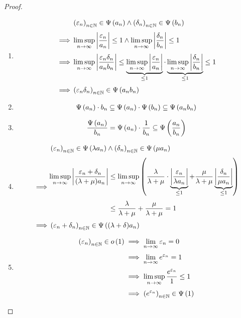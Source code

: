 \begin{proof}
\begin{enumerate}
    \item

      \begin{align}
        & \seq{\epsilon_n} \in \bigpsi{a_n} \land \seq{\delta_n} \in \bigpsi{b_n} \nl
        \implies & \limsup_{n\to\infty} \abs{\frac{\epsilon_n}{a_n}} \le 1 \land \limsup_{n\to\infty} \abs{\frac{\delta_n}{b_n}} \le 1 \nl
        \implies & \limsup_{n\to\infty} \abs{\frac{\epsilon_n\delta_n}{a_nb_n}} \le \underbrace{\limsup_{n\to\infty} \abs{\frac{\epsilon_n}{a_n}}}_{\le 1} \cdot \underbrace{\limsup_{n\to\infty} \abs{\frac{\delta_n}{b_n}}}_{\le 1} \le 1 \nl
        \implies & \seq{\epsilon_n\delta_n} \in \bigpsi{a_nb_n}
      \end{align}

    \item

      \begin{align}
        \Psi\left( {a_n} \right) \cdot b_n \subseteq \Psi\left( {a_n} \right) \cdot \Psi\left( {b_n} \right) \subseteq \Psi\left( {a_n b_n} \right)
      \end{align}

    \item

      \begin{align}
        \frac{\Psi\left( {a_n} \right)}{b_n} = \Psi\left( {a_n} \right) \cdot \frac{1}{b_n} \subseteq \Psi\left( {\frac{a_n}{b_n}} \right)
      \end{align}

    \item

      \begin{align}
        & \seq{\epsilon_n} \in \bigpsi{\lambda a_n} \land \seq{\delta_n} \in \bigpsi{\mu a_n} \nl
        \implies &
        \begin{aligned}
          \limsup_{n\to\infty} \abs{\frac{\epsilon_n+\delta_n}{(\lambda+\mu)a_n}} & \le \limsup_{n\to\infty} \left( \frac{\lambda}{\lambda + \mu} \cdot \underbrace{\abs{\frac{\epsilon_n}{\lambda a_n}}}_{\le 1} + \frac{\mu}{\lambda + \mu} \underbrace{\abs{\frac{\delta_n}{\mu a_n}}}_{\le 1} \right) \nl
          &\le \frac{\lambda}{\lambda+\mu} + \frac{\mu}{\lambda+\mu} = 1
        \end{aligned} \nl
        \implies & \seq{\epsilon_n+\delta_n} \in \bigpsi{(\lambda+\delta)a_n}
      \end{align}
    \item

      \begin{align}
        \seq{\epsilon_n} \in \littleo{1} & \implies \lim_{n\to\infty} \epsilon_n = 0 \nl
        & \implies \lim_{n\to\infty} e^{\epsilon_n} = 1 \nl
        & \implies \limsup_{n\to\infty} \frac{e^{\epsilon_n}}{1} \le 1 \nl
        & \implies \seq{e^{\epsilon_n}} \in \bigpsi{1}
      \end{align}


\end{enumerate}
\end{proof}
